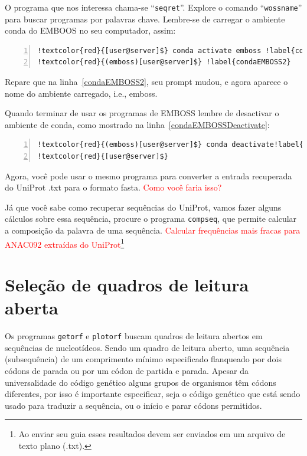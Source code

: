 \documentclass[letter,11pt]{book}
\begin{document}
O programa que nos interessa chama-se ``\Verb+seqret+''. Explore o comando ``\Verb+wossname+'' para buscar programas por palavras chave. Lembre-se de carregar o ambiente conda do EMBOOS no seu computador, assim:

\begin{Verbatim}[commandchars=!\{\},firstnumber=last,numbers=left,label=carregando ambiente EMBOSS com conda,frame=topline,fontsize=\scriptsize]
!textcolor{red}{[user@server]$} conda activate emboss !label{condaEMBOSS}
!textcolor{red}{(emboss)[user@server]$} !label{condaEMBOSS2}
\end{Verbatim}

Repare que na linha~\ref{condaEMBOSS2}, seu prompt mudou, e agora aparece o nome do ambiente carregado, i.e., emboss.

Quando terminar de usar os programas de EMBOSS lembre de desactivar o ambiente de conda, como mostrado na linha~\ref{condaEMBOSSDeactivate}:

\begin{Verbatim}[commandchars=!\{\},firstnumber=last,numbers=left,label=encerrando ambiente EMBOSS com conda,frame=topline,fontsize=\scriptsize]
!textcolor{red}{(emboss)[user@server]$} conda deactivate!label{condaEMBOSSDeactivate}
!textcolor{red}{[user@server]$} 
\end{Verbatim}


Agora, você pode usar o mesmo programa para converter a entrada recuperada do UniProt .txt para o formato fasta. \textcolor{red}{Como você faria isso?}

Já que você sabe como recuperar sequências do UniProt, vamos fazer alguns cálculos sobre essa sequência, procure o programa \Verb+compseq+, que permite calcular a composição da palavra de uma sequência. \textcolor{red}{Calcular frequências mais fracas para ANAC092 extraídas do UniProt}\footnote{Ao enviar seu guia esses resultados devem ser enviados em um arquivo de texto plano (.txt).}

\section{Seleção de quadros de leitura aberta}

Os programas \Verb+getorf+ e \Verb+plotorf+ buscam quadros de leitura abertos em sequências de nucleotídeos. Sendo um quadro de leitura aberto, uma sequência (subsequência) de um comprimento mínimo especificado flanqueado por dois códons de parada ou por um códon de partida e parada. Apesar da universalidade do código genético alguns grupos de organismos têm códons diferentes, por isso é importante especificar, seja o código genético que está sendo usado para traduzir a sequência, ou o início e parar códons permitidos.
\end{document}
